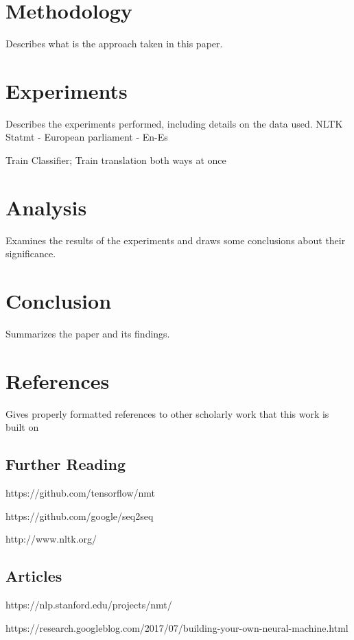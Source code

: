 \documentclass[10pt,a4paper]{report}
\begin{document}
\section{Methodology}  Describes what is the approach taken in this paper.

\clearpage

\section{Experiments} Describes the experiments performed, including details on the data used.
NLTK
Statmt - European parliament - En-Es

Train Classifier; Train translation both ways at once

\clearpage

\section{Analysis} Examines the results of the experiments and draws some conclusions
about their significance.

\clearpage

\section{Conclusion} Summarizes the paper and its findings.

\clearpage

\section{References} Gives properly formatted references to other scholarly work that this
work is built on


\subsection{Further Reading}

https://github.com/tensorflow/nmt

https://github.com/google/seq2seq

http://www.nltk.org/

\subsection{Articles}

https://nlp.stanford.edu/projects/nmt/

https://research.googleblog.com/2017/07/building-your-own-neural-machine.html
\end{document}

